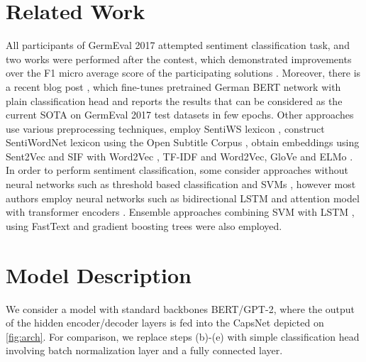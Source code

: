 \documentclass{article}
\begin{document}




\section{Related Work}
\label{sec:related}

All participants of GermEval 2017 attempted sentiment classification task, and two works were performed after the contest, which demonstrated improvements over the F1 micro average score of the participating solutions \cite{germevaltask2017, biesialska2020sentiment}. Moreover, there is a recent blog post \cite{kostic2020}, which fine-tunes pretrained German BERT network with plain classification head and reports the results that can be considered as the current SOTA on GermEval 2017 test datasets in few epochs. Other approaches use various preprocessing techniques, employ SentiWS lexicon \cite{schulz2017germeval, hovelmann2017fasttext, sidarenka2017potts}, construct SentiWordNet lexicon using the Open Subtitle Corpus \cite{naderalvojoud2017germeval}, obtain embeddings using Sent2Vec and SIF with Word2Vec \cite{lee2017ukp}, TF-IDF and Word2Vec\cite{ruppert2017lt}, GloVe \cite{mishra2017, biesialska2020sentiment} and ELMo \cite{biesialska2020sentiment}. In order to perform sentiment classification, some consider approaches without neural networks such as threshold based classification \cite{schulz2017germeval} and SVMs \cite{sidarenka2017potts}, however most authors employ neural networks such as bidirectional LSTM \cite{sidarenka2017potts, mishra2017, naderalvojoud2017germeval, lee2017ukp} and attention model with transformer encoders \cite{biesialska2020sentiment}. Ensemble approaches combining SVM with LSTM \cite{sidarenka2017potts}, using FastText  \cite{hovelmann2017fasttext} and gradient boosting trees \cite{hovelmann2017fasttext, sayyed2017idst} were also employed.

\section{Model Description}
We consider a model with standard backbones BERT/GPT-2, where the output of the hidden encoder/decoder layers is fed into the CapsNet depicted on \ref{fig:arch}. For comparison, we replace steps (b)-(e) with simple classification head involving batch normalization layer and a fully connected layer. 
 
\end{document}

